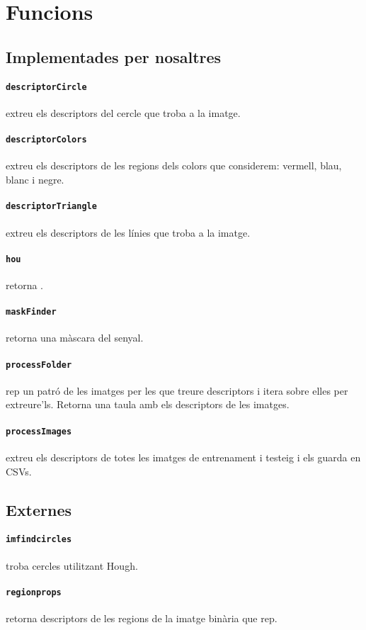 
\section{Funcions}

\subsection{Implementades per nosaltres}

\paragraph{\texttt{descriptorCircle}} extreu els descriptors del cercle que troba
a la imatge.

\paragraph{\texttt{descriptorColors}} extreu els descriptors de les regions dels
colors que considerem: vermell, blau, blanc i negre.

\paragraph{\texttt{descriptorTriangle}} extreu els descriptors de les línies que troba
a la imatge.

\paragraph{\texttt{hou}} retorna .

\paragraph{\texttt{maskFinder}} retorna una màscara del senyal.

\paragraph{\texttt{processFolder}} rep un patró de les imatges per les que treure 
descriptors i itera sobre elles per extreure'ls. Retorna una taula amb els descriptors
de les imatges.

\paragraph{\texttt{processImages}} extreu els descriptors de totes les imatges de
entrenament i testeig i els guarda en CSVs.

\subsection{Externes}

\paragraph{\texttt{imfindcircles}} troba cercles utilitzant Hough.

\paragraph{\texttt{regionprops}} retorna descriptors de les regions de la
imatge binària que rep.